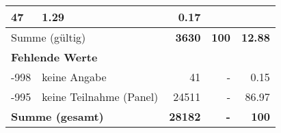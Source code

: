 \begin{longtable}{lXrrr}
       \num{47} &
       \num[round-mode=places,round-precision=2]{1,29} &
         \num[round-mode=places,round-precision=2]{0,17} \\
     \midrule
     \multicolumn{2}{l}{Summe (gültig)} &
       \textbf{\num{3630}} &
     \textbf{100} &
       \textbf{\num[round-mode=places,round-precision=2]{12,88}} \\
     \multicolumn{5}{l}{\textbf{Fehlende Werte}}\\
       -998 &
       keine Angabe &
         \num{41} &
        - &
         \num[round-mode=places,round-precision=2]{0,15} \\
       -995 &
       keine Teilnahme (Panel) &
         \num{24511} &
        - &
         \num[round-mode=places,round-precision=2]{86,97} \\
     \midrule
     \multicolumn{2}{l}{\textbf{Summe (gesamt)}} &
          \textbf{\num{28182}} &
        \textbf{-} &
        \textbf{100} \\
     \bottomrule
     \end{longtable}
     
